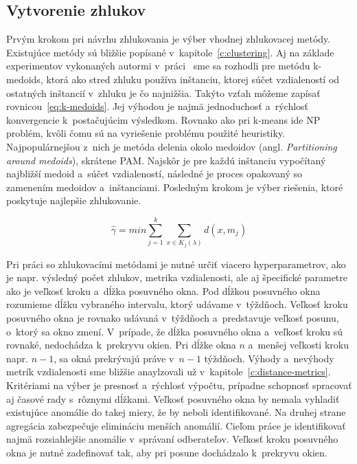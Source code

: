 \documentclass[a4paper,twoside,slovak,12pt,appendix]{article}
\begin{document}
\subsection{Vytvorenie zhlukov}
Prvým krokom pri návrhu zhlukovania je výber vhodnej zhlukovacej metódy.
Existujúce metódy sú bližšie popísané v~kapitole~\ref{c:clustering}. Aj na
základe experimentov vykonaných autormi v~práci~\cite{PhDLaurinec2018} sme sa
rozhodli pre metódu k-medoids, ktorá ako stred zhluku používa inštanciu, ktorej
súčet vzdialeností od ostatných inštancií v~zhluku je čo najnižšia. Takýto
vzťah môžeme zapísať rovnicou~\ref{eq:k-medoids}. Jej výhodou je najmä
jednoduchosť a~rýchlosť konvergencie k~postačujúcim výsledkom. Rovnako ako pri
k-means ide NP problém, kvôli čomu sú na vyriešenie problému použité heuristiky.
Najpopulárnejšou z~nich je metóda delenia okolo medoidov (angl.
\textit{Partitioning around medoids}), skrátene PAM. Najskôr je pre každú
inštanciu vypočítaný najbližší medoid a~súčet vzdialeností, následné je proces
opakovaný so zamenením medoidov a~inštanciami. Posledným krokom je výber
riešenia, ktoré poskytuje najlepšie zhlukovanie.

\begin{equation}
  \label{eq:k-medoids}
  \hat{\gamma} = min \sum_{j=1}^{k} \sum_{x \in K_j(\lambda)} d(x, m_j)
\end{equation}

\noindent
Pri práci so zhlukovacími metódami je nutné určiť viacero hyperparametrov, ako
je napr. výsledný počet zhlukov, metrika vzdialenosti, ale aj špecifické
parametre ako je veľkosť kroku a~dĺžka posuvného okna. Pod dĺžkou posuvného okna
rozumieme dĺžku vybraného intervalu, ktorý udávame v~týždňoch. Veľkosť kroku
posuvného okna je rovnako udávaná v~týždňoch a~predstavuje veľkosť posunu,
o~ktorý sa okno zmení. V~prípade, že dĺžka posuvného okna a~veľkosť kroku sú
rovnaké, nedochádza k~prekryvu okien. Pri dĺžke okna $n$ a~menšej veľkosti kroku
napr. $n-1$, sa okná prekrývajú práve v~$n-1$ týždňoch. Výhody a~nevýhody metrík
vzdialenosti sme bližšie anaylzovali už v~kapitole~\ref{c:distance-metrics}.
Kritériami na výber je presnosť a~rýchlosť výpočtu, prípadne schopnosť spracovať
aj časové rady s~rôznymi dĺžkami. Veľkosť posuvného okna by nemala vyhladiť
existujúce anomálie do takej miery, že by neboli identifikované. Na druhej
strane agregácia zabezpečuje elimináciu menších anomálií. Cieľom práce je
identifikovať najmä rozsiahlejšie anomálie v~správaní odberateľov. Veľkosť kroku
posuvného okna je nutné zadefinovať tak, aby pri posune dochádzalo k~prekryvu
okien.
\end{document}
